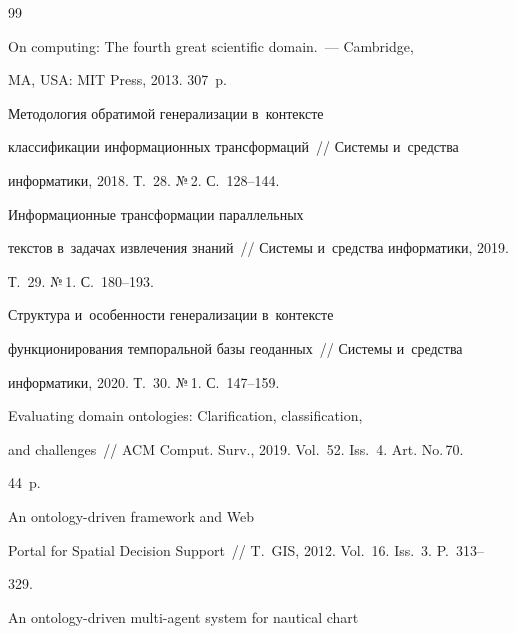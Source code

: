 {\small\frenchspacing


{%




\begin{thebibliography}{99}




   On computing: The fourth great scientific domain.~--- Cambridge, 


MA, USA: MIT Press, 2013. 307~p.




   Методология обратимой генерализации в~контексте 


классификации информационных трансформаций~/\!\!/ Системы и~средства 


информатики, 2018. Т.~28. №\,2. С.~128--144.




   Информационные трансформации параллельных 


текстов в~задачах извлечения знаний~/\!\!/ Системы и~средства информатики, 2019. 


Т.~29. №\,1. С.~180--193.




   Структура и~особенности генерализации в~контексте 


функционирования темпоральной базы геоданных~/\!\!/ Системы и~средства 


информатики, 2020. Т.~30. №\,1. С.~147--159.




   Evaluating domain ontologies: Clarification, classification, 


and challenges~/\!\!/ ACM Comput. Surv., 2019. Vol.~52. Iss.~4. Art. No.\,70.


44~p.




   An ontology-driven framework and Web 


Portal for Spatial Decision Support~/\!\!/ T.~GIS, 2012. Vol.~16. Iss.~3. P.~313--


329.




   An ontology-driven multi-agent system for nautical chart 



\end{thebibliography}}}
